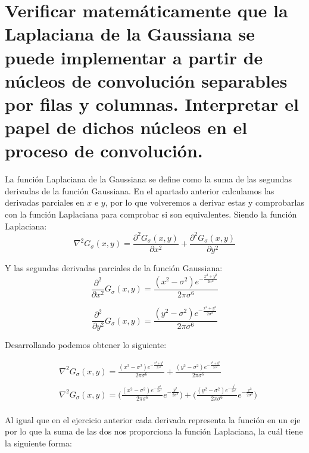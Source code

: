 \documentclass{article}
\begin{document}
\section{Verificar matemáticamente que la Laplaciana de la Gaussiana se puede implementar a partir de núcleos de convolución separables por filas y columnas. Interpretar el papel de dichos núcleos en el proceso de convolución. }

La función Laplaciana de la Gaussiana se define como la suma de las segundas derivadas de la función Gaussiana. En el apartado anterior calculamos las derivadas parciales en $x$ e $y$, por lo que volveremos a derivar estas y comprobarlas con la función Laplaciana para comprobar si son equivalentes.
Siendo la función Laplaciana:
\begin{equation}
\nabla^2 G_{\sigma}(x,y) = \frac{\partial^2 G_{\sigma}(x,y)}{\partial x^2} + \frac{\partial^2 G_{\sigma}(x,y)}{\partial y^2}
\end{equation}


Y las segundas derivadas parciales de la función Gaussiana:
\begin{equation}
\frac{\partial^2}{\partial x^2} G_{\sigma}(x,y) = \frac{(x^2-\sigma^2)e^{-\frac{x^2+y^2}{2\sigma^2}}}{2\pi\sigma^6}
\end{equation}

\begin{equation}
\frac{\partial^2}{\partial y^2} G_{\sigma}(x,y) = \frac{(y^2-\sigma^2)e^{-\frac{x^2+y^2}{2\sigma^2}}}{2\pi\sigma^6}
\end{equation}

Desarrollando podemos obtener lo siguiente:

\begin{align*}
& \nabla^2 G_{\sigma}(x,y) = \frac{(x^2-\sigma^2)e^{-\frac{x^2+y^2}{2\sigma^2}}}{2\pi\sigma^6} + \frac{(y^2-\sigma^2)e^{-\frac{x^2+y^2}{2\sigma^2}}}{2\pi\sigma^6}\\
\\
& \nabla^2 G_{\sigma}(x,y) = \Bigg( \frac{(x^2-\sigma^2)e^{-\frac{x^2}{2\sigma^2}}}{2\pi\sigma^6}e^{-\frac{y^2}{2\sigma^2}}\Bigg) + \Bigg( \frac{(y^2-\sigma^2)e^{-\frac{y^2}{2\sigma^2}}}{2\pi\sigma^6}e^{-\frac{x^2}{2\sigma^2}}\Bigg)\\
\end{align*}

Al igual que en el ejercicio anterior cada derivada representa la función en un eje por lo que la suma de las dos nos proporciona la función Laplaciana, la cuál tiene la siguiente forma:
\end{document}
